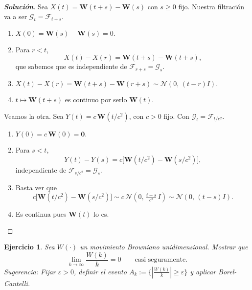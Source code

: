\documentclass[11pt]{article}
\theoremstyle{ejstyle}
\newtheorem{ejercicio}{Ejercicio}
\newenvironment{solucion}
{\begin{proof}[{\bfseries\color{deepindigo} Solución}]}
	{\end{proof}}
\begin{document}
	\begin{solucion}
		Sea $X(t) = \mathbf{W}(t+s) - \mathbf{W}(s)$ con $s \geq 0$ fijo. Nuestra filtración va a ser $\mathcal{G}_t = \mathcal{F}_{t+s}.$
		\begin{enumerate}
			\item $X(0) = \mathbf{W}(s) - \mathbf{W}(s) = 0.$
			\item Para $r < t$,
			\[
			X(t) - X(r) = \mathbf{W}(t +s) - \mathbf{W}(t+s),
			\]
			que sabemos que es independiente de $\mathcal{F}_{r+s} = \mathcal{G}_s.$
			
			\item $X(t) - X(r) = \mathbf{W}(t+s) - \mathbf{W}(r+s)
			\sim \mathcal{N}\!\left(0,\,(t-r)I\right).$
			
			\item $t \mapsto \mathbf{W}(t+s)$ es continuo por
			serlo $\mathbf{W}(t)$.
		\end{enumerate}
		
		Veamos la otra. Sea $Y(t) = c\,\mathbf{W}(t/c^2)$, con $c > 0$ fijo. Con $\mathcal{G}_t = \mathcal{F}_{t/c^2}.$
		\begin{enumerate}
			\item $Y(0) = c\,\mathbf{W}(0) = \mathbf{0}.$
			\item Para $s < t$,
			\[
			Y(t) - Y(s) = c\bigl[\mathbf{W}(t/c^2) - \mathbf{W}(s/c^2)\bigr],
			\]
			independiente de $\mathcal{F}_{s/c^2} = \mathcal{G}_{s}$.
			
			\item Basta ver que 
			$$
			c\bigl[\mathbf{W}(t/c^2) - \mathbf{W}(s/c^2)\bigr] \sim c\,\mathcal{N}\!\left(0,\,\tfrac{t-s}{c^2}\,I\right)
					\sim \mathcal{N}\!\left(0,\,(t-s)I\right).
			$$
			
			\item Es continua pues $\mathbf{W}(t)$ lo es.
		\end{enumerate}
	\end{solucion}
	

	\begin{ejercicio}
		Sea $W(\cdot)$ un movimiento Browniano unidimensional. Mostrar que
		\[
		\lim_{k \to \infty} \frac{W(k)}{k} = 0 \qquad \text{casi seguramente.}
		\]
		\textit{Sugerencia:} Fijar $\varepsilon > 0$, definir el evento
		$A_k := \{|\frac{W(k)}{k}| \geq \varepsilon\}$ y aplicar Borel-Cantelli.
	\end{ejercicio}
	
\end{document}
